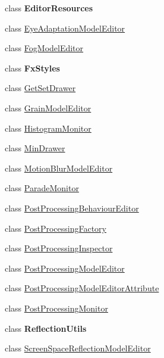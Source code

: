 \begin{DoxyCompactItemize}
\item 
class {\bfseries Editor\+Resources}
\item 
class \mbox{\hyperlink{class_unity_editor_1_1_post_processing_1_1_eye_adaptation_model_editor}{Eye\+Adaptation\+Model\+Editor}}
\item 
class \mbox{\hyperlink{class_unity_editor_1_1_post_processing_1_1_fog_model_editor}{Fog\+Model\+Editor}}
\item 
class {\bfseries Fx\+Styles}
\item 
class \mbox{\hyperlink{class_unity_editor_1_1_post_processing_1_1_get_set_drawer}{Get\+Set\+Drawer}}
\item 
class \mbox{\hyperlink{class_unity_editor_1_1_post_processing_1_1_grain_model_editor}{Grain\+Model\+Editor}}
\item 
class \mbox{\hyperlink{class_unity_editor_1_1_post_processing_1_1_histogram_monitor}{Histogram\+Monitor}}
\item 
class \mbox{\hyperlink{class_unity_editor_1_1_post_processing_1_1_min_drawer}{Min\+Drawer}}
\item 
class \mbox{\hyperlink{class_unity_editor_1_1_post_processing_1_1_motion_blur_model_editor}{Motion\+Blur\+Model\+Editor}}
\item 
class \mbox{\hyperlink{class_unity_editor_1_1_post_processing_1_1_parade_monitor}{Parade\+Monitor}}
\item 
class \mbox{\hyperlink{class_unity_editor_1_1_post_processing_1_1_post_processing_behaviour_editor}{Post\+Processing\+Behaviour\+Editor}}
\item 
class \mbox{\hyperlink{class_unity_editor_1_1_post_processing_1_1_post_processing_factory}{Post\+Processing\+Factory}}
\item 
class \mbox{\hyperlink{class_unity_editor_1_1_post_processing_1_1_post_processing_inspector}{Post\+Processing\+Inspector}}
\item 
class \mbox{\hyperlink{class_unity_editor_1_1_post_processing_1_1_post_processing_model_editor}{Post\+Processing\+Model\+Editor}}
\item 
class \mbox{\hyperlink{class_unity_editor_1_1_post_processing_1_1_post_processing_model_editor_attribute}{Post\+Processing\+Model\+Editor\+Attribute}}
\item 
class \mbox{\hyperlink{class_unity_editor_1_1_post_processing_1_1_post_processing_monitor}{Post\+Processing\+Monitor}}
\item 
class {\bfseries Reflection\+Utils}
\item 
class \mbox{\hyperlink{class_unity_editor_1_1_post_processing_1_1_screen_space_reflection_model_editor}{Screen\+Space\+Reflection\+Model\+Editor}}

\end{DoxyCompactItemize}
